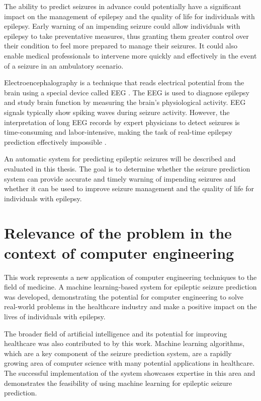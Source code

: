 The ability to predict seizures in advance could potentially have a significant impact on the management of epilepsy and the quality of life for individuals with epilepsy. Early warning of an impending seizure could allow individuals with epilepsy to take preventative measures, thus granting them greater control over their condition to feel more prepared to manage their seizures. 
It could also enable medical professionals to intervene more quickly and effectively in the event of a seizure in an ambulatory scenario.

Electroencephalography is a technique that reads electrical potential from the brain using a special device called \gls{EEG} \cite{kumar_analysis_2012}. The \gls{EEG} is used to diagnose epilepsy and study brain function by measuring the brain's physiological activity. \gls{EEG} signals typically show spiking waves during seizure activity. However, the interpretation of long \gls{EEG} records by expert physicians to detect seizures is time-consuming and labor-intensive, making the task of real-time epilepsy prediction effectively impossible \cite{siuly_eeg_2016}.

An automatic system for predicting epileptic seizures will be described and evaluated in this thesis. The goal is to determine whether the seizure prediction system can provide accurate and timely warning of impending seizures and whether it can be used to improve seizure management and the quality of life for individuals with epilepsy.

\section{Relevance of the problem in the context of computer engineering}

This work represents a new application of computer engineering techniques to the field of medicine. A machine learning-based system for epileptic seizure prediction was developed, demonstrating the potential for computer engineering to solve real-world problems in the healthcare industry and make a positive impact on the lives of individuals with epilepsy.

The broader field of artificial intelligence and its potential for improving healthcare was also contributed to by this work. Machine learning algorithms, which are a key component of the seizure prediction system, are a rapidly growing area of computer science with many potential applications in healthcare. The successful implementation of the system showcases expertise in this area and demonstrates the feasibility of using machine learning for epileptic seizure prediction.

